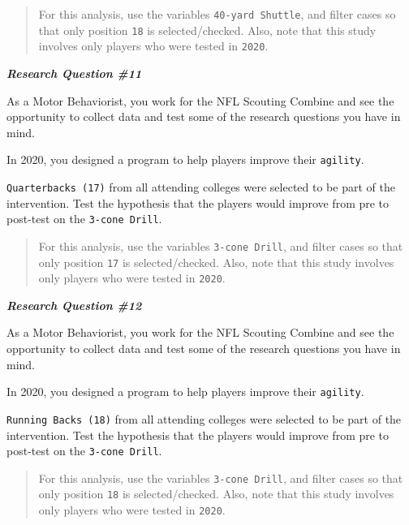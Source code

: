\documentclass[11pt,]{article}
\begin{document}
\begin{quote}
For this analysis, use the variables \texttt{40-yard\ Shuttle}, and
filter cases so that only position \texttt{18} is selected/checked.
Also, note that this study involves only players who were tested in
\texttt{2020}.
\end{quote}

\textbf{\emph{Research Question \#11}}

As a Motor Behaviorist, you work for the NFL Scouting Combine and see
the opportunity to collect data and test some of the research questions
you have in mind.

In 2020, you designed a program to help players improve their
\texttt{agility}.

\texttt{Quarterbacks\ (17)} from all attending colleges were selected to
be part of the intervention. Test the hypothesis that the players would
improve from pre to post-test on the \texttt{3-cone\ Drill}.

\begin{quote}
For this analysis, use the variables \texttt{3-cone\ Drill}, and filter
cases so that only position \texttt{17} is selected/checked. Also, note
that this study involves only players who were tested in \texttt{2020}.
\end{quote}

\textbf{\emph{Research Question \#12}}

As a Motor Behaviorist, you work for the NFL Scouting Combine and see
the opportunity to collect data and test some of the research questions
you have in mind.

In 2020, you designed a program to help players improve their
\texttt{agility}.

\texttt{Running\ Backs\ (18)} from all attending colleges were selected
to be part of the intervention. Test the hypothesis that the players
would improve from pre to post-test on the \texttt{3-cone\ Drill}.

\begin{quote}
For this analysis, use the variables \texttt{3-cone\ Drill}, and filter
cases so that only position \texttt{18} is selected/checked. Also, note
that this study involves only players who were tested in \texttt{2020}.
\end{quote}
\end{document}

